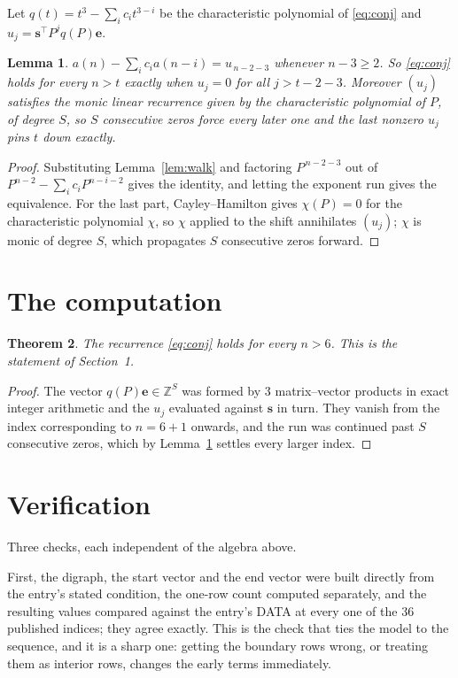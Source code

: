 \documentclass[11pt,a4paper]{article}
\theoremstyle{plain}
\newtheorem{theorem}{Theorem}
\newtheorem{lemma}[theorem]{Lemma}
\theoremstyle{definition}
\begin{document}
Let $q(t)=t^{3}-\sum_i c_i t^{3-i}$ be the characteristic polynomial of
\eqref{eq:conj} and $u_j=\mathbf{s}^{\!\top}P^{j}q(P)\mathbf{e}$.

\begin{lemma}\label{lem:crit}
$a(n)-\sum_i c_i a(n-i)=u_{\,n-2-3}$ whenever $n-3\ge2$. So \eqref{eq:conj}
holds for every $n>t$ exactly when $u_j=0$ for all $j>t-2-3$. Moreover $(u_j)$
satisfies the monic linear recurrence given by the characteristic polynomial of $P$, of
degree $S$, so $S$ consecutive zeros force every later one and the last nonzero $u_j$ pins
$t$ down exactly.
\end{lemma}

\begin{proof}
Substituting Lemma~\ref{lem:walk} and factoring $P^{\,n-2-3}$ out of
$P^{n-2}-\sum_i c_i P^{n-i-2}$ gives the identity, and letting the exponent run gives the
equivalence. For the last part, Cayley--Hamilton gives $\chi(P)=0$ for the characteristic
polynomial $\chi$, so $\chi$ applied to the shift annihilates $(u_j)$; $\chi$ is monic of
degree $S$, which propagates $S$ consecutive zeros forward.
\end{proof}

\section{The computation}

\begin{theorem}
The recurrence \eqref{eq:conj} holds for every $n>6$. This is the statement of
Section~1.
\end{theorem}

\begin{proof}
The vector $q(P)\mathbf{e}\in\mathbb{Z}^{S}$ was formed by $3$ matrix--vector
products in exact integer arithmetic and the $u_j$ evaluated against $\mathbf{s}$ in turn.
They vanish from the index corresponding to $n=6+1$ onwards, and the run was continued
past $S$ consecutive zeros, which by Lemma~\ref{lem:crit} settles every larger index.
\end{proof}

\section{Verification}

Three checks, each independent of the algebra above.

First, the digraph, the start vector and the end vector were built directly from the
entry's stated condition, the one-row count computed separately, and the resulting values
compared against the entry's DATA at every one of the $36$ published indices; they
agree exactly. This is the check that ties the model to the sequence, and it is a sharp one:
getting the boundary rows wrong, or treating them as interior rows, changes the early terms
immediately.
\end{document}
